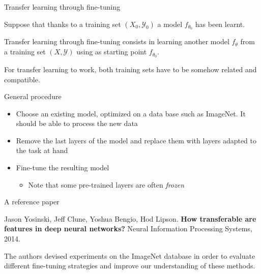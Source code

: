 \documentclass[xcolor=pdftex,dvipsnames,table,mathserif]{beamer}
\begin{document}
\begin{frame}{Transfer learning through fine-tuning}

\begin{block}{}
  Suppose that thanks to a training set $(X_0, \mathcal{Y}_0)$ a model $f_{\theta_0}$ has been learnt.

  Transfer learning through fine-tuning consists in learning another model $f_{\theta}$ from a training set $(X, \mathcal{Y})$ using as starting point $f_{\theta_0}$.

  For transfer learning to work, both training sets have to be somehow related and compatible.
\end{block}

\end{frame}

\begin{frame}{General procedure}

  \begin{itemize}
  \item Choose an existing model, optimized on a data base such as ImageNet. It should be able to process the new data
  \item Remove the last layers of the model and replace them with layers adapted to the task at hand
  \item Fine-tune the resulting model

    \begin{itemize}
    \item Note that some pre-trained layers are often \emph{frozen}
    \end{itemize}
  \end{itemize}

\end{frame}

\begin{frame}{A reference paper \cite{yosinski_how_2014}}

\begin{block}{}
  Jason Yosinski, Jeff Clune, Yoshua Bengio, Hod Lipson. \textbf{How transferable are features in deep neural networks?} Neural Information Processing Systems, 2014.
\end{block}

The authors devised experiments on the ImageNet database in order to evaluate different fine-tuning strategies and improve our understanding of these methods.

\end{frame}
\end{document}
